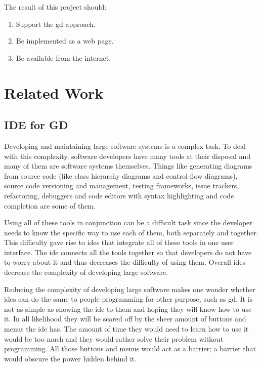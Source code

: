 \documentclass{./llncs2e/llncs}
\begin{document}
	The result of this project should:
	\begin{enumerate}
		\item Support the \acl{gd} approach.
		\item Be implemented as a web page.
		\item Be available from the internet.
	\end{enumerate}
	

\section{Related Work}

\subsection{IDE for GD}
	Developing and maintaining large software systems is a complex task.
	To deal with this complexity, software developers have many tools at their disposal and many of them are software systems themselves.
	Things like generating diagrams from source code (like class hierarchy diagrams and control-flow diagrams), source code versioning and management, testing frameworks, issue trackers, refactoring, debuggers and code editors with syntax highlighting and code completion are some of them.

	Using all of these tools in conjunction can be a difficult task since the developer needs to know the specific way to use each of them, both separately and together.
	This difficulty gave rise to \ac{ide}s that integrate all of these tools in one user interface.
	The \ac{ide} connects all the tools together so that developers do not have to worry about it and thus decreases the difficulty of using them.
	Overall \ac{ide}s decrease the complexity of developing large software.

	Reducing the complexity of developing large software makes one wonder whether \acp{ide} can do the same to people programming for other purpose, such as \ac{gd}.
	It is not as simple as showing the \ac{ide} to them and hoping they will know how to use it.
	In all likelihood they will be scared off by the sheer amount of buttons and menus the \ac{ide} has.
	The amount of time they would need to learn how to use it would be too much and they would rather solve their problem without programming.
	All those buttons and menus would act as a barrier; a barrier that would obscure the power hidden behind it.
	
\end{document}
